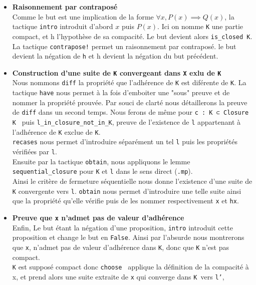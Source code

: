 \documentclass[a4paper, 12pt]{article}
\newcommand{\lean}[1]{\texttt{#1}}
\begin{document}
\begin{itemize}[itemsep=30pt]
    \item \textbf{Raisonnement par contraposé}\\
    Comme le but est une implication de la forme $ \forall x, P(x) \implies Q(x)$, la tactique \lean{intro} introduit d'abord $x$ puis $P(x)$. Ici on nomme \lean{K} une partie compact,
    et h l'hypothèse de sa compacité. Le but devient alors \lean{is_closed K}.\\
    La tactique \lean{contrapose!} permet un raisonnement par contraposé. le but devient la négation de \lean{h} et h devient la négation du but précédent.
    \item \textbf{Construction d'une suite de \lean{K} convergeant dans \lean{X} exlu de \lean{K} }\\
    Nous nommons \lean{diff} la propriété que l'adhérence de \lean{K} est diférente de \lean{K}. La tactique \lean{have} nous permet à la fois d'emboiter une "sous" preuve et de nommer
    la propriété prouvée. Par souci de clarté nous détaillerons la preuve de \lean{diff} dans un second temps. Nous ferons de même pour \lean{c : K ⊂ Closure K } puis
    \lean{l_in_closure_not_in_K}, preuve de l'existence de \lean{l} appartenant à l'adhérence de \lean{K} exclue de \lean{K}.\\
    \lean{recases} nous permet d'introduire séparément un tel \lean{l} puis les propriétés vérifiées par \lean{l}.\\
    Ensuite par la tactique \lean{obtain}, nous appliquons le lemme \lean{sequential_closure} pour \lean{K} et \lean{l} dans le sens direct (\lean{.mp}).\\
    Ainsi le critère de fermeture séquentielle nous donne l'existence d'une suite de \lean{K} convergente vers \lean{l}. \lean{obtain} nous permet d'introduire une telle suite ainsi que
    la propriété qu'elle vérifie puis de les nommer respectivement \lean{x} et \lean{hx}.
    \item \textbf{ Preuve que \lean{x} n'admet pas de valeur d'adhérence}\\
    Enfin, Le but étant la négation d'une proposition, \lean{intro} introduit cette proposition et change le but en \lean{False}. Ainsi par l'absurde nous montrerons que \lean{x},
    n'admet pas de valeur d'adhérence dans \lean{K}, donc que \lean{K} n'est pas compact. \\
    \lean{K} est supposé compact donc \lean{choose } applique la définition de la compacité à x, et prend alors une suite extraite de \lean{x} qui converge dans \lean{K }vers \lean{l'},

\end{itemize}
\end{document}
